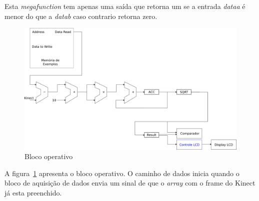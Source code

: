 Esta \textit{megafunction} tem apenas uma saída que retorna um se a entrada
\textit{dataa} é menor do que a \textit{datab} caso contrario retorna zero.

\begin{figure}[h]
\centering
\includegraphics[width=.7\textwidth]{../apresentacao/knn_sem_controle}
\caption{Bloco operativo}
\label{fig:blocoperativo}
\end{figure}

A figura~\ref{fig:blocoperativo} apresenta o bloco operativo. O caminho de
dados inicia quando o bloco de aquisição de dados envia um sinal de que o 
\textit{array} com o frame do Kinect já esta preenchido.
